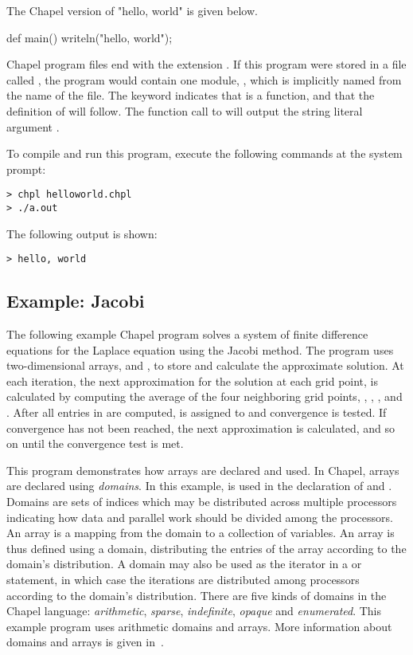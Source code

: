 The Chapel version of "hello, world" is given below.
\begin{chapel}
def main() {
  writeln("hello, world");
}
\end{chapel}
Chapel program files end with the extension .  
If this program were stored in a file called ,
the program would contain one module, , which is implicitly
named from the name of the file.  The keyword  indicates that 
 is a function, and that the definition of  will 
follow.  The function call to  will output the string
literal argument .

To compile and run this program, execute the following
commands at the system prompt:
\begin{verbatim} 
> chpl helloworld.chpl
> ./a.out
\end{verbatim}
The following output is shown:
\begin{verbatim}
> hello, world
\end{verbatim}

\subsection{Example: Jacobi}
The following example Chapel program solves a system of finite difference
equations for the Laplace equation using the Jacobi method.  The program uses
two-dimensional arrays,  and , to store and calculate the approximate
solution.  At each iteration, the next approximation for the solution at 
each grid point,  is calculated by computing the average of 
the four neighboring grid points,
, , , and .  
After all entries in  are computed,  is assigned to 
and convergence is tested.  If convergence has not been reached, the next
approximation is calculated, and so on until the convergence test is met.

This program demonstrates how arrays are declared and used.  In Chapel, 
arrays are declared using {\em domains}.  In this example,  is
used in the declaration of  and .
Domains are sets of indices which may be distributed
across multiple processors indicating how data and parallel work should
be divided among the processors.  An array is a mapping from the domain
to a collection of variables.  An array is thus defined using a domain, distributing
the entries of the array according to the domain's distribution.
A domain may also be used as the iterator in a  or
 statement, in which case the iterations are distributed among processors
according to the domain's distribution.  There are five kinds of domains in
the Chapel language:  {\em arithmetic}, {\em sparse}, {\em indefinite},
{\em opaque} and {\em enumerated}.  This example program uses arithmetic domains
and arrays.  More information about domains and arrays is given in~.

